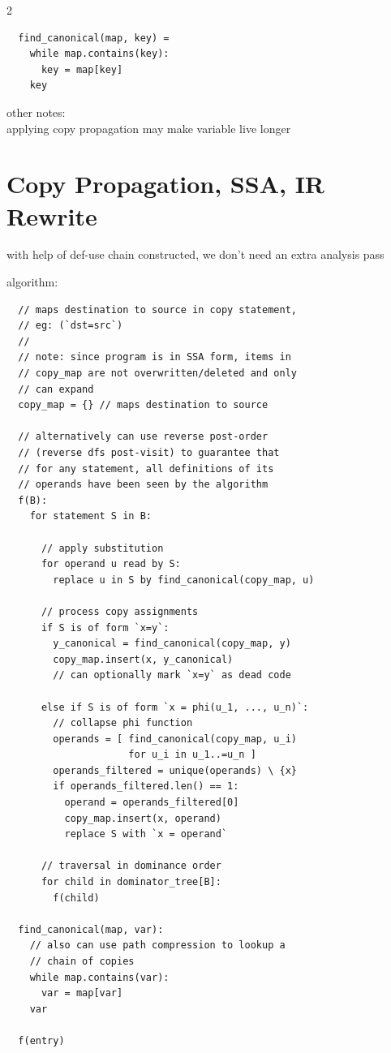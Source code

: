 \documentclass[8pt]{extarticle}
\begin{document}
\begin{multicols*}{2}
\begin{verbatim}
  find_canonical(map, key) = 
    while map.contains(key):
      key = map[key]
    key
  \end{verbatim}

  other notes:\\
  applying copy propagation may make variable live longer

  \vfill\null
  \columnbreak

  \section{Copy Propagation, SSA, IR Rewrite}

  with help of def-use chain constructed, we don't need an extra analysis pass

  algorithm:

  \begin{verbatim}
  // maps destination to source in copy statement,
  // eg: (`dst=src`)
  //
  // note: since program is in SSA form, items in
  // copy_map are not overwritten/deleted and only
  // can expand
  copy_map = {} // maps destination to source

  // alternatively can use reverse post-order
  // (reverse dfs post-visit) to guarantee that
  // for any statement, all definitions of its
  // operands have been seen by the algorithm
  f(B):
    for statement S in B:

      // apply substitution
      for operand u read by S:
        replace u in S by find_canonical(copy_map, u)

      // process copy assignments
      if S is of form `x=y`:
        y_canonical = find_canonical(copy_map, y)
        copy_map.insert(x, y_canonical)
        // can optionally mark `x=y` as dead code

      else if S is of form `x = phi(u_1, ..., u_n)`:
        // collapse phi function
        operands = [ find_canonical(copy_map, u_i)
                     for u_i in u_1..=u_n ]
        operands_filtered = unique(operands) \ {x}
        if operands_filtered.len() == 1:
          operand = operands_filtered[0]
          copy_map.insert(x, operand)
          replace S with `x = operand`

      // traversal in dominance order
      for child in dominator_tree[B]:
        f(child)

  find_canonical(map, var):
    // also can use path compression to lookup a
    // chain of copies
    while map.contains(var):
      var = map[var]
    var

  f(entry)
  \end{verbatim}
  

\end{multicols*}
\end{document}
